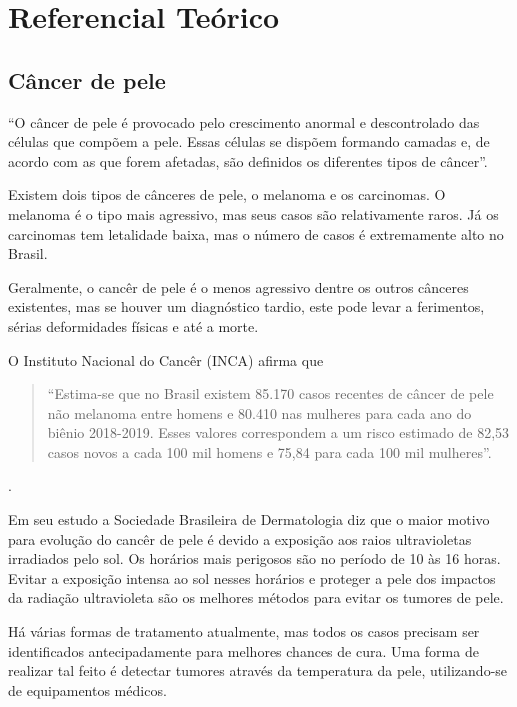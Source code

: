 
\chapter[Referencial Teórico]{Referencial Teórico}

\section{Câncer de pele}

    ``O câncer de pele é provocado pelo crescimento anormal e descontrolado das células que compõem a pele. Essas células se dispõem formando camadas e, de acordo com as que forem afetadas, são definidos os diferentes tipos de câncer''\cite{sbd}.
    
    Existem dois tipos de cânceres de pele, o melanoma e os carcinomas. O melanoma é o tipo mais agressivo, mas seus casos são relativamente raros. Já os carcinomas tem letalidade baixa, mas  o número de casos é extremamente alto no Brasil.
    
    Geralmente, o cancêr de pele é o menos agressivo dentre os outros cânceres existentes, mas se houver um diagnóstico tardio, este pode levar a ferimentos, sérias deformidades físicas e até a morte.
    
               
    O Instituto Nacional do Cancêr (INCA) afirma que  \begin{quotation}
    
    
    
    ``Estima-se que no Brasil existem 85.170 casos recentes de câncer de pele não melanoma entre homens e 80.410 nas mulheres para cada ano do biênio 2018-2019. Esses valores correspondem a um risco estimado de 82,53 casos novos a cada 100 mil homens e 75,84 para cada 100 mil mulheres''\cite[p.54]{Estimativa}.
  \end{quotation}
    .%
              
    Em seu estudo a Sociedade Brasileira de Dermatologia diz que  o maior motivo para evolução do cancêr de pele é devido a exposição aos raios ultravioletas irradiados pelo sol. Os horários mais perigosos são no período de 10 às 16 horas. Evitar a exposição intensa ao sol nesses horários e proteger a pele dos impactos da radiação ultravioleta são os melhores métodos para evitar os tumores de pele.%

 


 Há várias formas de tratamento atualmente, mas todos os casos precisam ser identificados antecipadamente para melhores chances de cura. Uma forma de realizar tal feito  é detectar tumores através da temperatura da pele, utilizando-se de equipamentos médicos.
 
